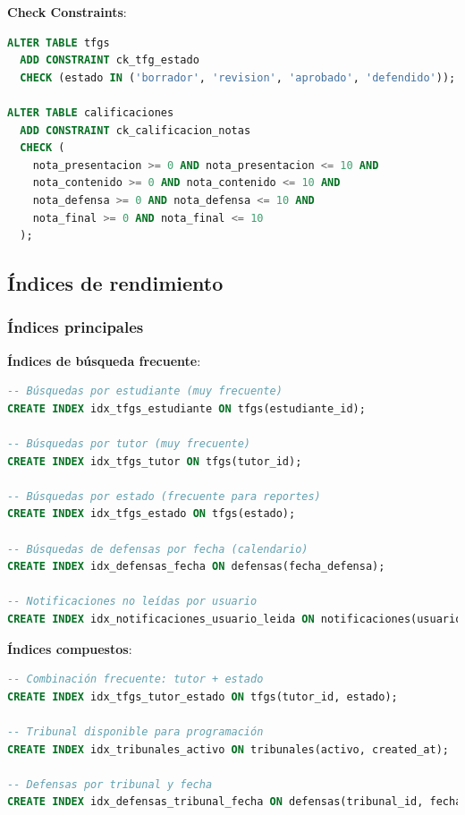 \documentclass[12pt,a4paper,oneside]{report}
\begin{document}
\textbf{Check Constraints}:

\begin{lstlisting}[language=SQL]
ALTER TABLE tfgs 
  ADD CONSTRAINT ck_tfg_estado 
  CHECK (estado IN ('borrador', 'revision', 'aprobado', 'defendido'));

ALTER TABLE calificaciones 
  ADD CONSTRAINT ck_calificacion_notas 
  CHECK (
    nota_presentacion >= 0 AND nota_presentacion <= 10 AND
    nota_contenido >= 0 AND nota_contenido <= 10 AND
    nota_defensa >= 0 AND nota_defensa <= 10 AND
    nota_final >= 0 AND nota_final <= 10
  );
\end{lstlisting}

\subsection{Índices de rendimiento}\label{uxedndices-de-rendimiento}

\subsubsection{Índices principales}\label{uxedndices-principales}

\textbf{Índices de búsqueda frecuente}:

\begin{lstlisting}[language=SQL]
-- Búsquedas por estudiante (muy frecuente)
CREATE INDEX idx_tfgs_estudiante ON tfgs(estudiante_id);

-- Búsquedas por tutor (muy frecuente)  
CREATE INDEX idx_tfgs_tutor ON tfgs(tutor_id);

-- Búsquedas por estado (frecuente para reportes)
CREATE INDEX idx_tfgs_estado ON tfgs(estado);

-- Búsquedas de defensas por fecha (calendario)
CREATE INDEX idx_defensas_fecha ON defensas(fecha_defensa);

-- Notificaciones no leídas por usuario
CREATE INDEX idx_notificaciones_usuario_leida ON notificaciones(usuario_id, leida);
\end{lstlisting}

\textbf{Índices compuestos}:

\begin{lstlisting}[language=SQL]
-- Combinación frecuente: tutor + estado
CREATE INDEX idx_tfgs_tutor_estado ON tfgs(tutor_id, estado);

-- Tribunal disponible para programación
CREATE INDEX idx_tribunales_activo ON tribunales(activo, created_at);

-- Defensas por tribunal y fecha
CREATE INDEX idx_defensas_tribunal_fecha ON defensas(tribunal_id, fecha_defensa);
\end{lstlisting}
\end{document}
